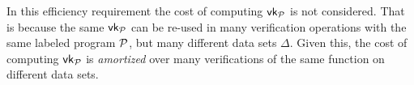 In this efficiency requirement the cost of computing $\vk_\calP$ is not
considered. That is because the same $\vk_\calP$ can be re-used in many
verification operations with the same labeled program $\mathcal{P}$, but many
different data sets $\Delta$. Given this, the cost of computing $\vk_\calP$ is
\emph{amortized} over many verifications of the same function on different data
sets.

\begin{comment}
\subsection{Homomorphic Evaluation of Arithmetic Circuits} Here we
follow~\cite{backes:fiore:reischuk:2013} to present some basic definitions
regarding the homomorphic evaluation of arithmetic circuits over values defined
in some appropriate set $\calJ \neq \calM$. Usually,
$\function{f}{\bbZ_p^n}{\bbZ_p}$, but sometimes the message space may be
defined in $\calJ$, and so it is necessary to obtain an equivalent algorithm
that evaluates messages from $\calJ$ over $f$.

\paragraph*{Homomorphic Evaluation over Polynomials} Consider that
$\calJ_{\poly} = \bbZ_p[x_1, \dotsc, x_m]$ is the ring of polynomials in
variables $x_1, \dotsc, x_m$ over $\bbZ_p$. For every tuple $\vec{a} = (a_1,
\dotsc, a_m) \in \bbZ_p^m$, let
$\function{\phi_{\vec{a}}}{\calJ_{\poly}}{\bbZ_p}$ be the function defined as
$\phi_{\vec{a}}(y) = y(a_1, \dotsc, a_m)$ for any $y \in \calJ_{\poly}$.
$\phi_{\vec{a}}$ is a homomorphism from $\calJ_{\poly}$ to $\bbZ_p$.
%
Given an arithmetic circuit $\function{f}{\bbZ_p^n}{\bbZ_p}$, there exists
another structurally equivalent circuit
$\function{\hat{f}}{\calJ_{\poly}^n}{\calJ_{\poly}}$ such that $\forall y_1,
\dotsc, y_n \in \calJ_{\poly} \colon \phi_{\vec{a}}(\hat{f}(y_1, \dotsc, y_n))
= f(\phi_{\vec{a}}(y_1), \dotsc, \phi_{\vec{a}}(y_n))$. The only difference is
that in every gate the operation in $\bbZ_p$ is replaced by the corresponding
operation in $\bbZ_p[x_1, \dotsc, x_m]$.

More precisely, for every positive integer $m \in \bbN$ and a given $f$, the
computation of $\hat{f}$ on $(y_1, \dotsc, y_n) \in \calJ^n_{\poly}$ can be
defined as $\PolyEval(m, f, y_1, \dotsc, y_n) \to \bbZ_p$. For every gate
$f_g$, on input two polynomials $y_1, y_2 \in \calJ_{\poly}$, proceeds as
follows: if $f_g = +$, it outputs $y = y_1 + y_2$ (adds all coefficients
component-wise); if $f_g = \times$, it outputs $y = y_1 \cdot y_2$ (uses the
convolution operator on the coefficients). Notice that every $\times$ gate
increases the degree $d$ of $y$, as well as its number of coefficients. If
$y_1, y_2$ have degree $d_1, d_2$ respectively, the degree of $y = y_1 \cdot
y_2$ is $d_1 + d_2$.


\end{comment}
